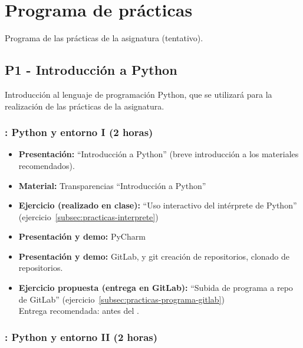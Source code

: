 \documentclass[a4paper,12pt]{article}
\begin{document}
\section{Programa de prácticas}

Programa de las prácticas de la asignatura (tentativo).

\subsection{P1 - Introducción a Python}

Introducción al lenguaje de programación Python, que se utilizará para la realización de las prácticas de la asignatura.

\subsubsection{\martesA: Python y entorno I  (2 horas)}
\label{cal:martesA}

\begin{itemize}
\item \textbf{Presentación:} ``Introducción a Python'' (breve introducción a los materiales recomendados).
\item \textbf{Material:} Transparencias ``Introducción a Python''
\item \textbf{Ejercicio (realizado en clase):} ``Uso interactivo del intérprete de Python'' (ejercicio~\ref{subsec:practicas-interprete})
\item \textbf{Presentación y demo:} PyCharm

\item \textbf{Presentación y demo:} GitLab, y git creación de repositorios, clonado de repositorios.

\item \textbf{Ejercicio propuesta (entrega en GitLab):} ``Subida de programa a repo de GitLab'' (ejercicio~\ref{subsec:practicas-programa-gitlab}) \\
   Entrega recomendada: antes del \martesB.
\end{itemize}

\subsubsection{\martesB: Python y entorno II  (2 horas)}
\label{cal:martesB}
\end{document}
